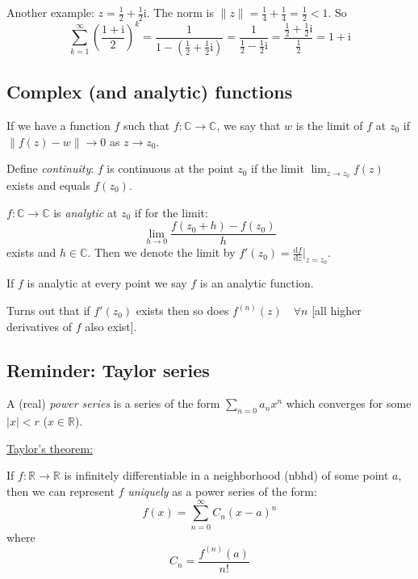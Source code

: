 \documentclass{article}
\newcommand{\mathd}{\mathrm{d}}
\newcommand{\mathi}{\mathrm{i}}
\newcommand{\tmem}[1]{{\em #1\/}}
\newcommand{\tmtextbf}[1]{\text{{\bfseries{#1}}}}
\newcommand{\tmxspace}{\hspace{1em}}
\begin{document}
Another example: $z = \frac{1}{2} + \frac{1}{2} \mathi$. The norm is $\| z \|
= \frac{1}{4} + \frac{1}{4} = \frac{1}{2} < 1$. So
\[ \sum_{k = 1}^{\infty} \left( \frac{1 + \mathi}{2} \right)^k = \frac{1}{1 -
   \left( \frac{1}{2} + \frac{1}{2} \mathi \right)} = \frac{1}{\frac{1}{2} -
   \frac{1}{2} \mathi} = \frac{\frac{1}{2} + \frac{1}{2} \mathi}{\frac{1}{2}}
   = 1 + \mathi \]

\subsection*{Complex (and analytic) functions}

If we have a function $f$ such that $f : \mathbb{C} \rightarrow \mathbb{C}$,
we say that $w$ is the limit of $f$ at $z_0$ if $\| f (z) - w \| \rightarrow
0$ as $z \rightarrow z_0$.

Define {\tmem{continuity}}: $f$ is continuous at the point $z_0$ if the limit
$\lim_{z \rightarrow z_0} f (z)$ exists and equals $f (z_0)$.

\tmtextbf{Definition:} $f : \mathbb{C} \rightarrow \mathbb{C}$ is
{\tmem{analytic}} at $z_0$ if for the limit:
\[ \lim_{h \rightarrow 0}  \frac{f (z_0 + h) - f (z_0)}{h} \]
exists and $h \in \mathbb{C}$. Then we denote the limit by $f' (z_0) =
\frac{\mathd f}{\mathd z} |_{z = z_0}$.

If $f$ is analytic at every point we say $f$ is an analytic function.

Turns out that if $f' (z_0)$ exists then so does $f^{(n)} (z) \tmxspace
\forall n$ [all higher derivatives of $f$ also exist].

\subsection*{Reminder: Taylor series}

A (real) {\tmem{power series}} is a series of the form $\sum_{n = 0} a_n x^n$
which converges for some $| x | < r$ ($x \in \mathbb{R}$).

{\underline{Taylor's theorem:}}

\begin{tmframed}
  If $f : \mathbb{R} \rightarrow \mathbb{R}$ is infinitely differentiable in a
  neighborhood (nbhd) of some point $a$, then we can represent $f$
  {\tmem{uniquely}} as a power series of the form:
  \[ f (x) = \sum_{n = 0}^{\infty} C_n (x - a)^n \]
  where
  \[ C_n = \frac{f^{(n)} (a)}{n!} \]
\end{tmframed}
\end{document}
